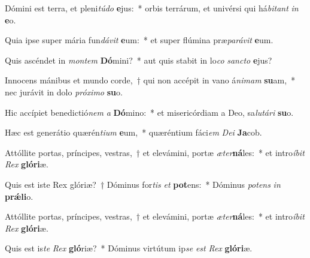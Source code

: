 \item Dómini est terra, et pleni\textit{tú}\textit{do} \textbf{e}jus:~* orbis terrárum, et univérsi qui há\textit{bi}\textit{tant} \textit{in} \textbf{e}o.
\item Quia ipse super mária fun\textit{dá}\textit{vit} \textbf{e}um:~* et super flúmina præ\textit{pa}\textit{rá}\textit{vit} \textbf{e}um.
\item Quis ascéndet in \textit{mon}\textit{tem} \textbf{Dó}mini?~* aut quis stabit in lo\textit{co} \textit{sanc}\textit{to} \textbf{e}jus?
\item Innocens mánibus et mundo corde,~† qui non accépit in vano á\textit{ni}\textit{mam} \textbf{su}am,~* nec jurávit in dolo \textit{pró}\textit{xi}\textit{mo} \textbf{su}o.
\item Hic accípiet benedictió\textit{nem} \textit{a} \textbf{Dó}mino:~* et misericórdiam a Deo, sa\textit{lu}\textit{tá}\textit{ri} \textbf{su}o.
\item Hæc est generátio quærén\textit{ti}\textit{um} \textbf{e}um,~* quæréntium fáci\textit{em} \textit{De}\textit{i} \textbf{Ja}cob.
\item Attóllite portas, príncipes, vestras,~† et elevámini, portæ \textit{æ}\textit{ter}\textbf{ná}les:~* et intro\textit{í}\textit{bit} \textit{Rex} \textbf{gló}\textbf{ri}æ.
\item Quis est iste Rex glóriæ?~† Dóminus for\textit{tis} \textit{et} \textbf{pot}ens:~* Dóminus \textit{pot}\textit{ens} \textit{in} \textbf{prǽ}\textbf{li}o.
\item Attóllite portas, príncipes, vestras,~† et elevámini, portæ \textit{æ}\textit{ter}\textbf{ná}les:~* et intro\textit{í}\textit{bit} \textit{Rex} \textbf{gló}\textbf{ri}æ.
\item Quis est is\textit{te} \textit{Rex} \textbf{gló}riæ?~* Dóminus virtútum ip\textit{se} \textit{est} \textit{Rex} \textbf{gló}\textbf{ri}æ.
